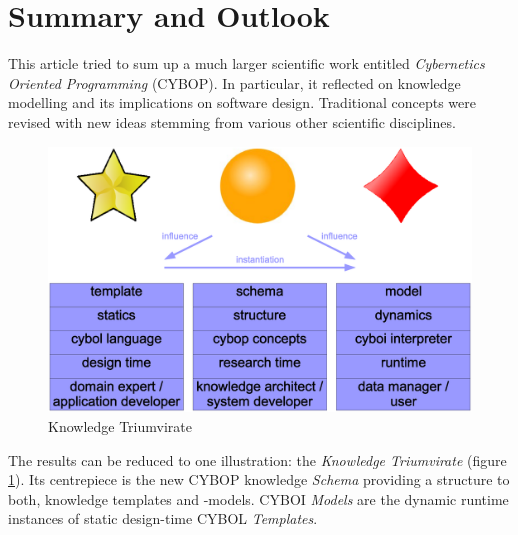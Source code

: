 %
%
%
%
%
%
%

\section{Summary and Outlook}
\label{summary_and_outlook_heading}

This article tried to sum up a much larger scientific work entitled
\emph{Cybernetics Oriented Programming} (CYBOP). In particular, it reflected on
knowledge modelling and its implications on software design. Traditional
concepts were revised with new ideas stemming from various other scientific
disciplines.

\begin{figure}[ht]
    \begin{center}
        \includegraphics[scale=0.2]{vector/triumvirate.eps}
        \caption{Knowledge Triumvirate}
        \label{triumvirate_figure}
    \end{center}
\end{figure}

The results can be reduced to one illustration: the \emph{Knowledge Triumvirate}
(figure \ref{triumvirate_figure}). Its centrepiece is the new CYBOP knowledge
\emph{Schema} providing a structure to both, knowledge templates and -models.
CYBOI \emph{Models} are the dynamic runtime instances of static design-time
CYBOL \emph{Templates}.

